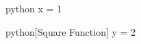 \documentclass{article}
\begin{document}
\begin{code}{python}
x = 1
\end{code}
\begin{code}{python}[Square Function]
y = 2
\end{code}
\end{document}
